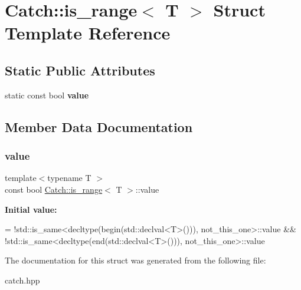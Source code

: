 \hypertarget{struct_catch_1_1is__range}{}\section{Catch\+:\+:is\+\_\+range$<$ T $>$ Struct Template Reference}
\label{struct_catch_1_1is__range}
\subsection*{Static Public Attributes}
\begin{DoxyCompactItemize}
\item 
static const bool {\bfseries value}
\end{DoxyCompactItemize}


\subsection{Member Data Documentation}
\mbox{\label{struct_catch_1_1is__range_afaec39e819c3956829cbbd00feba11be}} 
\subsubsection{\texorpdfstring{value}{value}}
{\footnotesize\ttfamily template$<$typename T $>$ \\
const bool \mbox{\hyperlink{struct_catch_1_1is__range}{Catch\+::is\+\_\+range}}$<$ T $>$\+::value\hspace{0.3cm}{\ttfamily [static]}}

{\bfseries Initial value\+:}
\begin{DoxyCode}
=
            !std::is\_same<decltype(begin(std::declval<T>())), not\_this\_one>::value &&
            !std::is\_same<decltype(end(std::declval<T>())), not\_this\_one>::value
\end{DoxyCode}


The documentation for this struct was generated from the following file\+:\begin{DoxyCompactItemize}
\item 
catch.\+hpp\end{DoxyCompactItemize}
